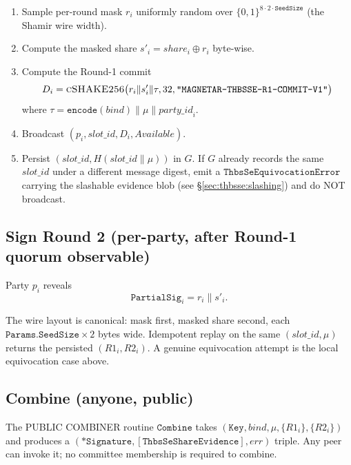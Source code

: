 \begin{enumerate}[leftmargin=2em,nosep]
  \item Sample per-round mask $r_i$ uniformly random over
        $\{0,1\}^{8 \cdot 2 \cdot \texttt{SeedSize}}$ (the
        Shamir wire width).
  \item Compute the masked share
        $s'_i = \mathit{share}_i \oplus r_i$ byte-wise.
  \item Compute the Round-1 commit
        \begin{equation*}
          D_i = \textsc{cSHAKE256}\big(
            r_i \| s'_i \| \tau,
            32, \texttt{"MAGNETAR-THBSSE-R1-COMMIT-V1"}\big)
        \end{equation*}
        where $\tau = \texttt{encode}(\mathit{bind}) \| \mu \|
        \mathit{party\_id}_i$.
  \item Broadcast
        $(p_i, \mathit{slot\_id}, D_i, \mathit{Available})$.
  \item Persist $(\mathit{slot\_id}, H(\mathit{slot\_id} \| \mu))$
        in $G$. If $G$ already records the same
        $\mathit{slot\_id}$ under a different message digest,
        emit a
        $\texttt{ThbsSeEquivocationError}$ carrying the
        slashable evidence blob (see
        \S\ref{sec:thbsse:slashing}) and do NOT broadcast.
\end{enumerate}

\subsection{Sign Round 2 (per-party, after Round-1 quorum
observable)}
\label{sec:thbsse:round2}

Party $p_i$ reveals
\begin{equation*}
  \texttt{PartialSig}_i = r_i \| s'_i.
\end{equation*}

The wire layout is canonical: mask first, masked share second,
each $\texttt{Params.SeedSize} \times 2$ bytes wide. Idempotent
replay on the same $(\mathit{slot\_id}, \mu)$ returns the
persisted $(R1_i, R2_i)$. A genuine equivocation attempt is the
local equivocation case above.

\subsection{Combine (anyone, public)}
\label{sec:thbsse:combine}

The PUBLIC COMBINER routine $\texttt{Combine}$ takes
$(\texttt{Key},
\mathit{bind}, \mu, \{R1_i\}, \{R2_i\})$ and produces a
$(*\texttt{Signature}, [\texttt{ThbsSeShareEvidence}], \mathit{err})$
triple. Any peer can invoke it; no committee membership is
required to combine.

